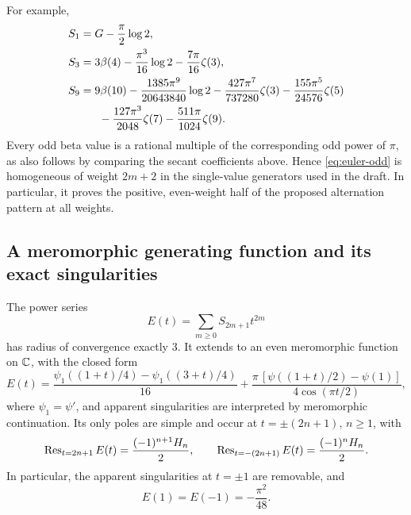 For example,
\begin{align*}
S_1&=G-\frac\pi2\log2,\\
S_3&=3\beta(4)-\frac{\pi^3}{16}\log2
                      -\frac{7\pi}{16}\zeta(3),\\
S_9&=9\beta(10)-\frac{1385\pi^9}{20643840}\log2
       -\frac{427\pi^7}{737280}\zeta(3)
       -\frac{155\pi^5}{24576}\zeta(5)\\
   &\hspace{1.7em}-\frac{127\pi^3}{2048}\zeta(7)
       -\frac{511\pi}{1024}\zeta(9).
\end{align*}
Every odd beta value is a rational multiple of the corresponding odd
power of \(\pi\), as also follows by comparing the secant coefficients
above. Hence \eqref{eq:euler-odd} is homogeneous of weight \(2m+2\)
in the single-value generators used in the draft. In particular, it
proves the positive, even-weight half of the proposed alternation
pattern at all weights.

\subsection{A meromorphic generating function and its exact singularities}

\begin{theorem}\label{thm:euler-generator}
The power series
\[
E(t)=\sum_{m\ge0}S_{2m+1}t^{2m}
\]
has radius of convergence exactly \(3\). It extends to an even
meromorphic function on \(\mathbb{C}\), with the closed form
\begin{equation}
\boxed{\displaystyle
E(t)=\frac{\psi_1((1+t)/4)-\psi_1((3+t)/4)}{16}
 +\frac{\pi\,[\psi((1+t)/2)-\psi(1)]}
        {4\cos(\pi t/2)},}
\label{eq:euler-generator}
\end{equation}
where \(\psi_1=\psi'\), and apparent singularities are interpreted
by meromorphic continuation. Its only poles are simple and occur at
\(t=\pm(2n+1)\), \(n\ge1\), with
\begin{equation}
\operatorname{Res}_{t=2n+1}E(t)=\frac{(-1)^{n+1}H_n}{2},\qquad
\operatorname{Res}_{t=-(2n+1)}E(t)=\frac{(-1)^nH_n}{2}.
\label{eq:euler-residues}
\end{equation}
In particular, the apparent singularities at \(t=\pm1\) are
removable, and
\begin{equation}
E(1)=E(-1)=-\frac{\pi^2}{48}.
\label{eq:euler-removable}
\end{equation}
\end{theorem}

